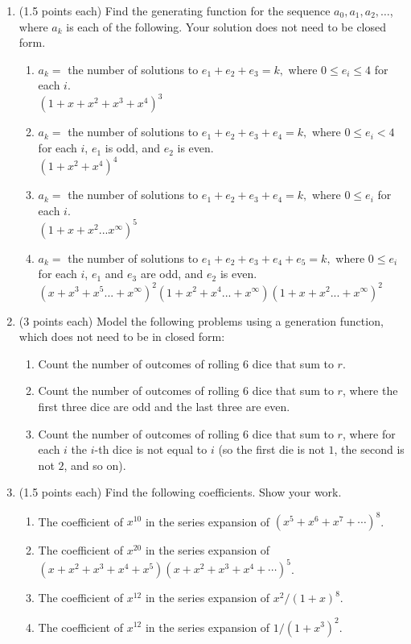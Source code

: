\documentclass[11pt]{article}
\begin{document}
\begin{enumerate}


\item (1.5 points each) Find the generating function for the sequence
$a_0, a_1, a_2, \ldots$, where $a_k$ is each of the following.
Your solution does not need to be closed form.
\begin{enumerate}
\item $a_k = $ the number of solutions to $e_1 + e_2 + e_3 = k,$
where $0 \leq e_i \leq 4$ for each $i$.\\
$(1 + x + x^2 + x^3 + x^4)^3$
\item $a_k = $ the number of solutions to $e_1 + e_2 + e_3 + e_4 = k,$
where $0 \leq e_i < 4$ for each $i$, $e_1$ is odd, and $e_2$ is even.\\
$(1 + x^2 + x^4)^4$
\item $a_k = $ the number of solutions to $e_1 + e_2 + e_3 + e_4 = k,$
where $0 \leq e_i$ for each $i$.\\
$(1 + x + x^2 ... x^{\infty})^5$
\item $a_k = $ the number of solutions to $e_1 + e_2 + e_3 + e_4 + e_5= k,$
where $0 \leq e_i$ for each $i$, $e_1$ and $e_3$ are odd, and $e_2$
is even.\\
$(x + x^3 + x^5 ... + x^{\infty})^2(1 + x^2 + x^4 ... + x^{\infty})(1 + x +x^2 ... +
x^{\infty})^2$
\end{enumerate}

\item (3 points each) Model the following problems using a generation function,
which does not need to be in closed form:  
\begin{enumerate}
\item Count the number of outcomes of
rolling $6$ dice that sum to $r$.
\item Count the number of outcomes of rolling $6$ dice that sum to $r$,
where the first three dice are odd and the last three are even.
\item Count the number of outcomes of rolling $6$ dice that sum to $r$,
where for each $i$ the $i$-th dice is not equal to $i$ (so
the first die is not $1$, the second is not $2$, and so on).
\end{enumerate}

\item (1.5 points each) Find the following coefficients.  Show your work.
\begin{enumerate}
\item The coefficient of $x^{10}$ in the series expansion of 
$(x^5+x^6 + x^7+ \cdots)^8$.
\item The coefficient of $x^{20}$ in the series expansion of 
$(x+x^2 + x^3+x^4+x^5) (x+x^2 + x^3+x^4+\cdots)^5 $.
\item The coefficient of $x^{12}$ in the series expansion of
$x^2/(1+x)^8$.
\item The coefficient of $x^{12}$ in the series expansion of
$1/(1+x^3)^2$.
\end{enumerate}

\end{enumerate}
\end{document}
